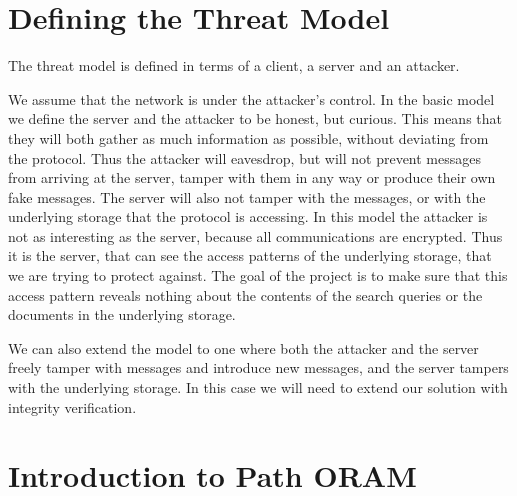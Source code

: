\documentclass[12pt,a4paper,twoside,openright]{report}
\begin{document}






\section{Defining the Threat Model}
\label{sec:threatmodel}


The threat model is defined in terms of a client, a server and an attacker.

We assume that the network is under the attacker's control. In the basic model we define the server and the attacker to be honest, but curious. This means that they will both gather as much information as possible, without deviating from the protocol. Thus the attacker will eavesdrop, but will not prevent messages from arriving at the server, tamper with them in any way or produce their own fake messages. The server will also not tamper with the messages, or with the underlying storage that the protocol is accessing. In this model the attacker is not as interesting as the server, because all communications are encrypted. Thus it is the server, that can see the access patterns of the underlying storage, that we are trying to protect against. The goal of the project is to make sure that this access pattern reveals nothing about the contents of the search queries or the documents in the underlying storage.

We can also extend the model to one where both the attacker and the server freely tamper with messages and introduce new messages, and the server tampers with the underlying storage. In this case we will need to extend our solution with integrity verification.

\section{Introduction to Path ORAM}
\label{sec:oramintro}
\end{document}
